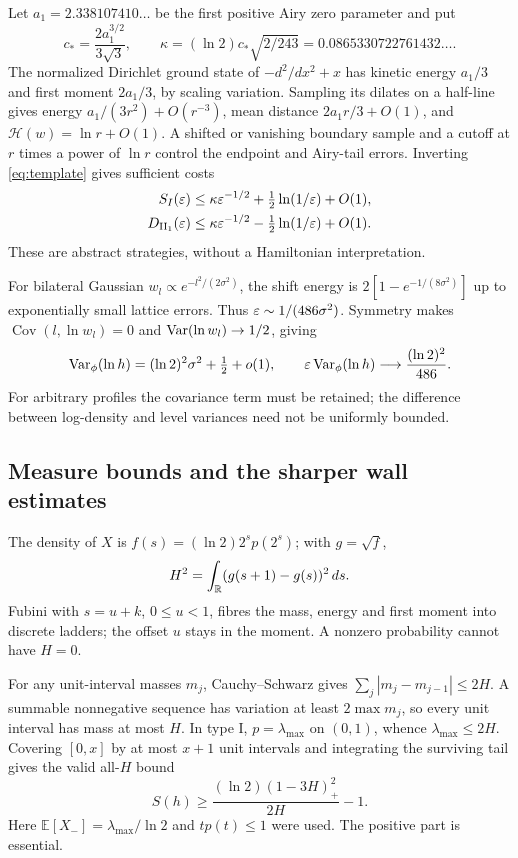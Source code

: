 Let $a_1=2.338107410\ldots$ be the first positive Airy zero parameter and put
\[
 c_*=\frac{2a_1^{3/2}}{3\sqrt3},\qquad
 \kappa=(\ln2)c_*\sqrt{2/243}=0.0865330722761432\ldots.
\]
The normalized Dirichlet ground state of $-d^2/dx^2+x$ has kinetic energy $a_1/3$ and first moment $2a_1/3$, by scaling variation. Sampling its dilates on a half-line gives energy $a_1/(3r^2)+O(r^{-3})$, mean distance $2a_1r/3+O(1)$, and $\mathcal H(w)=\ln r+O(1)$. A shifted or vanishing boundary sample and a cutoff at $r$ times a power of $\ln r$ control the endpoint and Airy-tail errors. Inverting \eqref{eq:template} gives sufficient costs
\begin{align*}
 S_I(\varepsilon)&\le\kappa\varepsilon^{-1/2}+\tfrac12\ln(1/\varepsilon)+O(1),\\
 D_{\mathrm{II}_1}(\varepsilon)&\le\kappa\varepsilon^{-1/2}-\tfrac12\ln(1/\varepsilon)+O(1).
\end{align*}
These are abstract strategies, without a Hamiltonian interpretation.

For bilateral Gaussian $w_l\propto e^{-l^2/(2\sigma^2)}$, the shift energy is $2[1-e^{-1/(8\sigma^2)}]$ up to exponentially small lattice errors. Thus $\varepsilon\sim1/(486\sigma^2)$. Symmetry makes $\operatorname{Cov}(l,\ln w_l)=0$ and $\operatorname{Var}(\ln w_l)\to1/2$, giving
\[
 \operatorname{Var}_\phi(\ln h)=(\ln2)^2\sigma^2+\tfrac12+o(1),\qquad
 \varepsilon\operatorname{Var}_\phi(\ln h)\longrightarrow\frac{(\ln2)^2}{486}.
\]
For arbitrary profiles the covariance term must be retained; the difference between log-density and level variances need not be uniformly bounded.

\subsection{Measure bounds and the sharper wall estimates}
The density of $X$ is $f(s)=(\ln2)2^sp(2^s)$; with $g=\sqrt f$,
\[
 H^2=\int_\mathbb R(g(s+1)-g(s))^2\,ds.
\]
Fubini with $s=u+k$, $0\le u<1$, fibres the mass, energy and first moment into discrete ladders; the offset $u$ stays in the moment. A nonzero probability cannot have $H=0$.

For any unit-interval masses $m_j$, Cauchy--Schwarz gives $\sum_j|m_j-m_{j-1}|\le2H$. A summable nonnegative sequence has variation at least $2\max m_j$, so every unit interval has mass at most $H$. In type I, $p=\lambda_{\max}$ on $(0,1)$, whence $\lambda_{\max}\le2H$. Covering $[0,x]$ by at most $x+1$ unit intervals and integrating the surviving tail gives the valid all-$H$ bound
\begin{equation}\label{eq:elementary}
 S(h)\ge\frac{(\ln2)(1-3H)_+^2}{2H}-1.
\end{equation}
Here $\mathbb E[X_-]=\lambda_{\max}/\ln2$ and $tp(t)\le1$ were used. The positive part is essential.

